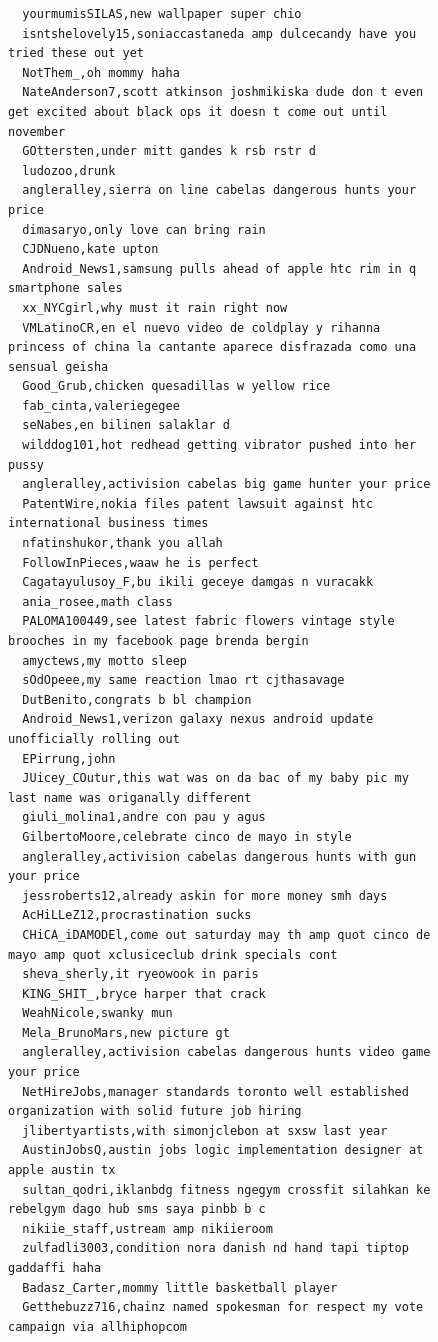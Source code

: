 \begin{figure}[htpb]
\begin{verbatim}
  yourmumisSILAS,new wallpaper super chio
  isntshelovely15,soniaccastaneda amp dulcecandy have you tried these out yet
  NotThem_,oh mommy haha
  NateAnderson7,scott atkinson joshmikiska dude don t even get excited about black ops it doesn t come out until november
  GOttersten,under mitt gandes k rsb rstr d
  ludozoo,drunk
  angleralley,sierra on line cabelas dangerous hunts your price
  dimasaryo,only love can bring rain
  CJDNueno,kate upton
  Android_News1,samsung pulls ahead of apple htc rim in q smartphone sales
  xx_NYCgirl,why must it rain right now
  VMLatinoCR,en el nuevo video de coldplay y rihanna princess of china la cantante aparece disfrazada como una sensual geisha
  Good_Grub,chicken quesadillas w yellow rice
  fab_cinta,valeriegegee
  seNabes,en bilinen salaklar d
  wilddog101,hot redhead getting vibrator pushed into her pussy
  angleralley,activision cabelas big game hunter your price
  PatentWire,nokia files patent lawsuit against htc international business times
  nfatinshukor,thank you allah
  FollowInPieces,waaw he is perfect
  Cagatayulusoy_F,bu ikili geceye damgas n vuracakk
  ania_rosee,math class
  PALOMA100449,see latest fabric flowers vintage style brooches in my facebook page brenda bergin
  amyctews,my motto sleep
  sOdOpeee,my same reaction lmao rt cjthasavage
  DutBenito,congrats b bl champion
  Android_News1,verizon galaxy nexus android update unofficially rolling out
  EPirrung,john
  JUicey_COutur,this wat was on da bac of my baby pic my last name was origanally different
  giuli_molina1,andre con pau y agus
  GilbertoMoore,celebrate cinco de mayo in style
  angleralley,activision cabelas dangerous hunts with gun your price
  jessroberts12,already askin for more money smh days
  AcHiLLeZ12,procrastination sucks
  CHiCA_iDAMODEl,come out saturday may th amp quot cinco de mayo amp quot xclusiceclub drink specials cont
  sheva_sherly,it ryeowook in paris
  KING_SHIT_,bryce harper that crack
  WeahNicole,swanky mun
  Mela_BrunoMars,new picture gt
  angleralley,activision cabelas dangerous hunts video game your price
  NetHireJobs,manager standards toronto well established organization with solid future job hiring
  jlibertyartists,with simonjclebon at sxsw last year
  AustinJobsQ,austin jobs logic implementation designer at apple austin tx
  sultan_qodri,iklanbdg fitness ngegym crossfit silahkan ke rebelgym dago hub sms saya pinbb b c
  nikiie_staff,ustream amp nikiieroom
  zulfadli3003,condition nora danish nd hand tapi tiptop gaddaffi haha
  Badasz_Carter,mommy little basketball player
  Getthebuzz716,chainz named spokesman for respect my vote campaign via allhiphopcom

\end{verbatim}
\end{figure}
